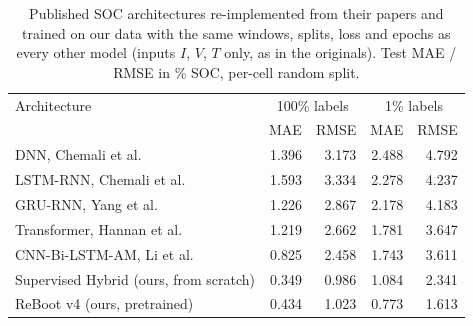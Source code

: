 \begin{table}[t]
\centering
\caption{Published SOC architectures re-implemented from their papers and trained on our data with the same windows, splits, loss and epochs as every other model (inputs $I$, $V$, $T$ only, as in the originals). Test MAE / RMSE in \% SOC, per-cell random split.}
\label{tab:lit_reimpl}
\begin{tabular}{lrrrr}
\toprule
Architecture & \multicolumn{2}{c}{100\% labels} & \multicolumn{2}{c}{1\% labels} \\
 & MAE & RMSE & MAE & RMSE \\
\midrule
DNN, Chemali et al.~\cite{chemali2018dnn} & 1.396 & 3.173 & 2.488 & 4.792 \\
LSTM-RNN, Chemali et al.~\cite{chemali2018lstm} & 1.593 & 3.334 & 2.278 & 4.237 \\
GRU-RNN, Yang et al.~\cite{yang2019gru} & 1.226 & 2.867 & 2.178 & 4.183 \\
Transformer, Hannan et al.~\cite{hannan2021transformer} & 1.219 & 2.662 & 1.781 & 3.647 \\
CNN-Bi-LSTM-AM, Li et al.~\cite{li2026cnnbilstm} & 0.825 & 2.458 & 1.743 & 3.611 \\
\midrule
Supervised Hybrid (ours, from scratch) & 0.349 & 0.986 & 1.084 & 2.341 \\
ReBoot v4 (ours, pretrained) & 0.434 & 1.023 & 0.773 & 1.613 \\
\bottomrule
\end{tabular}
\end{table}